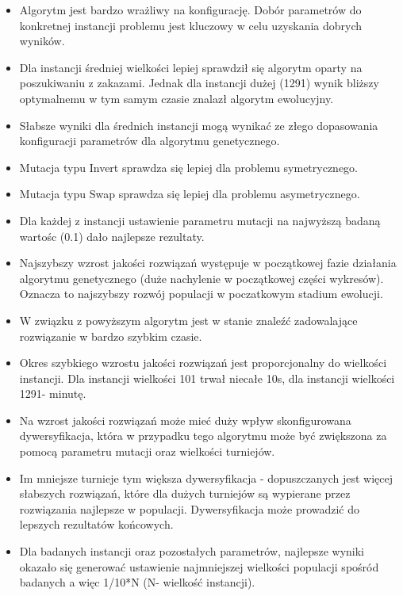 \documentclass[a4paper,11pt]{article}
\begin{document}
\begin{itemize}
\item Algorytm jest bardzo wrażliwy na konfigurację. Dobór parametrów do konkretnej instancji problemu jest kluczowy w celu uzyskania dobrych wyników.
\item Dla instancji średniej wielkości lepiej sprawdził się algorytm oparty na poszukiwaniu z zakazami. Jednak dla instancji dużej (1291) wynik bliższy optymalnemu w tym samym czasie znalazł algorytm ewolucyjny.
\item Słabsze wyniki dla średnich instancji mogą wynikać ze złego dopasowania konfiguracji parametrów dla algorytmu genetycznego.
\item Mutacja typu Invert sprawdza się lepiej dla problemu symetrycznego.
\item Mutacja typu Swap sprawdza się lepiej dla problemu asymetrycznego.
\item Dla każdej z instancji ustawienie parametru mutacji na najwyższą badaną wartośc (0.1) dało najlepsze rezultaty.
\item Najszybszy wzrost jakości rozwiązań występuje w początkowej fazie działania algorytmu genetycznego (duże nachylenie w początkowej części wykresów). Oznacza to najszybszy rozwój populacji w poczatkowym stadium ewolucji.
\item W związku z powyższym algorytm jest w stanie znaleźć zadowalające rozwiązanie w bardzo szybkim czasie.
\item Okres szybkiego wzrostu jakości rozwiązań jest proporcjonalny do wielkości instancji. Dla instancji wielkości 101 trwał niecałe 10s, dla instancji wielkości 1291-  minutę. 
\item Na wzrost jakości rozwiązań może mieć duży wpływ skonfigurowana dywersyfikacja, która w przypadku tego algorytmu może być zwiększona za pomocą parametru mutacji oraz wielkości turniejów.
\item Im mniejsze turnieje tym większa dywersyfikacja - dopuszczanych jest więcej słabszych rozwiązań, które dla dużych turniejów są wypierane przez rozwiązania najlepsze w populacji. Dywersyfikacja może prowadzić do lepszych rezultatów końcowych.
\item Dla badanych instancji oraz pozostałych parametrów, najlepsze wyniki okazało się generować ustawienie najmniejszej wielkości populacji spośród badanych a więc 1/10*N (N- wielkość instancji). 

\end{itemize}
\end{document}

